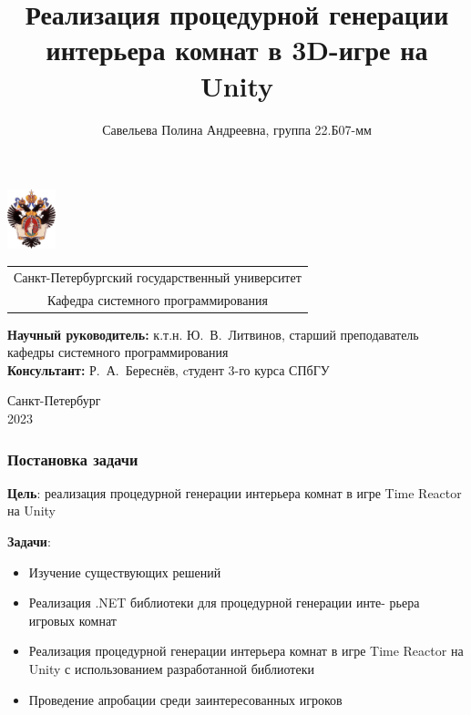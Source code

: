 \documentclass{beamer}
\title[Процедурная генерация интерьера]{Реализация процедурной генерации интерьера комнат в 3D-игре на Unity}
\institute[СПбГУ]{}
\author[Савельева Полина]{Савельева Полина Андреевна, группа 22.Б07-мм}
\begin{document}
{
\begin{frame}
  \includegraphics[width=1.4cm]{pictures/SPbGU_Logo.png}
\vspace{-35pt}
\hspace{-10pt}
\begin{center}
   \begin{tabular}{c}
        \scriptsize{Санкт-Петербургский государственный университет} \\
        \scriptsize{Кафедра системного программирования}
    \end{tabular}
\titlepage
\end{center}

\btVFill

{\scriptsize
   \textbf{Научный руководитель:} к.т.н. Ю.~В.~Литвинов, старший преподаватель кафедры системного программирования \\
   \textbf{Консультант:}  Р.~А.~Береснёв, cтудент 3-го курса СПбГУ \\
 }
\begin{center}
  \vspace{5pt}
  \scriptsize{Санкт-Петербург\\
                 2023}
  \end{center}

\end{frame}
}

\begin{frame}
  \frametitle{Постановка задачи}
  \textbf{Цель}: реализация процедурной генерации интерьера комнат в игре Time Reactor на Unity %

  \textbf{Задачи}:
  \begin{itemize}
    \item Изучение существующих решений
    \item Реализация .NET библиотеки для процедурной генерации инте-
рьера игровых комнат
    \item Реализация процедурной генерации интерьера комнат в игре Time
Reactor на Unity с использованием разработанной библиотеки
    \item Проведение апробации среди заинтересованных игроков
  \end{itemize}
\end{frame}
\end{document}
